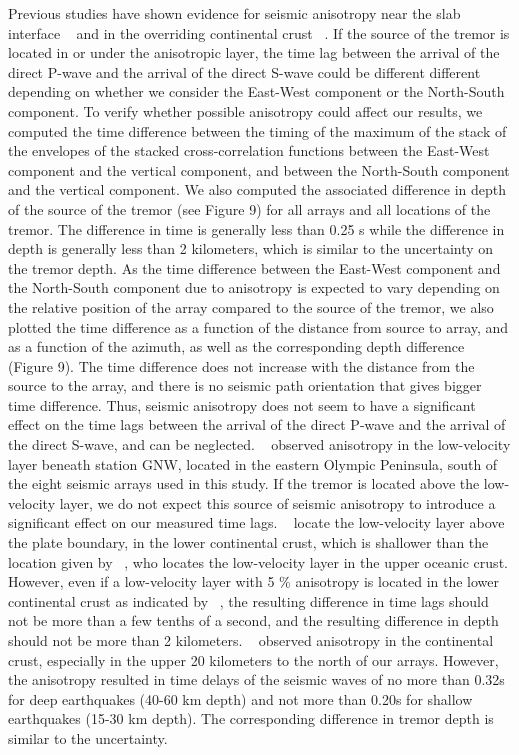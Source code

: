 \documentclass[draft]{agujournal2019}
\begin{document}
Previous studies have shown evidence for seismic anisotropy near the slab interface ~\cite{NIK_2009} and in the overriding continental crust ~\cite{CAS_1996}. If the source of the tremor is located in or under the anisotropic layer, the time lag between the arrival of the direct P-wave and the arrival of the direct S-wave could be different different depending on whether we consider the East-West component or the North-South component. To verify whether possible anisotropy could affect our results, we computed the time difference between the timing of the maximum of the stack of the envelopes of the stacked cross-correlation functions between the East-West component and the vertical component, and between the North-South component and the vertical component. We also computed the associated difference in depth of the source of the tremor (see Figure 9) for all arrays and all locations of the tremor. The difference in time is generally less than 0.25 s while the difference in depth is generally less than 2 kilometers, which is similar to the uncertainty on the tremor depth. As the time difference between the East-West component and the North-South component due to anisotropy is expected to vary depending on the relative position of the array compared to the source of the tremor, we also plotted the time difference as a function of the distance from source to array, and as a function of the azimuth, as well as the corresponding depth difference (Figure 9). The time difference does not increase with the distance from the source to the array, and there is no seismic path orientation that gives bigger time difference. Thus, seismic anisotropy does not seem to have a significant effect on the time lags between the arrival of the direct P-wave and the arrival of the direct S-wave, and can be neglected. ~ observed anisotropy in the low-velocity layer beneath station GNW, located in the eastern Olympic Peninsula, south of the eight seismic arrays used in this study. If the tremor is located above the low-velocity layer, we do not expect this source of seismic anisotropy to introduce a significant effect on our measured time lags. ~ locate the low-velocity layer above the plate boundary, in the lower continental crust, which is shallower than the location given by ~, who locates the low-velocity layer in the upper oceanic crust. However, even if a low-velocity layer with 5 \% anisotropy is located in the lower continental crust as indicated by ~, the resulting difference in time lags should not be more than a few tenths of a second, and the resulting difference in depth should not be more than 2 kilometers. ~ observed anisotropy in the continental crust, especially in the upper 20 kilometers to the north of our arrays. However, the anisotropy resulted in time delays of the seismic waves of no more than 0.32s for deep earthquakes (40-60 km depth) and not more than 0.20s for shallow earthquakes (15-30 km depth). The corresponding difference in tremor depth is similar to the uncertainty. \\
\end{document}
